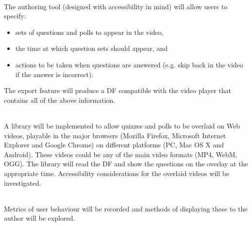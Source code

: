 \begin{description}[%
  before={\setcounter{descriptcount}{0}},%
  ,font=\bfseries\stepcounter{descriptcount}\thedescriptcount~]
	\item[Quiz Authoring Tool] \hfill \\
	The authoring tool (designed with accessibility in mind) will allow users to specify:

	\begin{itemize}
		\item sets of questions and polls to appear in the video,
		\item the time at which question sets should appear, and
		\item actions to be taken when questions are answered (e.g. skip back in the video if the answer is incorrect).
	\end{itemize}

	The export feature will produce a \gls{DF} compatible with the video player that contains all of the above information.

	\item[Questions Overlay] \hfill \\
	A library will be implemented to allow quizzes and polls to be overlaid on Web videos, playable in the major browsers (Mozilla Firefox, Microsoft Internet Explorer and Google Chrome) on different platforms (PC, Mac OS X and Android). These videos could be any of the main video formats (MP4, WebM, OGG). The library will read the \gls{DF} and show the questions on the overlay at the appropriate time. Accessibility considerations for the overlaid videos will be investigated.

	\item[Video and Quiz Analytics] \hfill \\
	Metrics of user behaviour will be recorded and methods of displaying these to the author will be explored.
\end{description}
